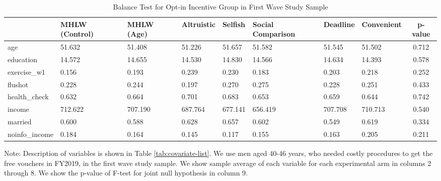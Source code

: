 \begin{table}[!h]

\caption{Balance Test for Opt-in Incentive Group in First Wave Study Sample \label{tab:int-coupon0-balance}}
\centering
\fontsize{9}{11}\selectfont
\begin{threeparttable}
\begin{tabular}[t]{l>{\centering\arraybackslash}p{3em}>{\centering\arraybackslash}p{3em}>{\centering\arraybackslash}p{3em}>{\centering\arraybackslash}p{3em}>{\centering\arraybackslash}p{3em}>{\centering\arraybackslash}p{3em}>{\centering\arraybackslash}p{3em}c}
\toprule
  & MHLW (Control) & MHLW (Age) & Altruistic & Selfish & Social Comparison & Deadline & Convenient & p-value\\
\midrule
age & \num{51.632} & \num{51.408} & \num{51.226} & \num{51.657} & \num{51.582} & \num{51.545} & \num{51.502} & \num{0.712}\\
education & \num{14.572} & \num{14.655} & \num{14.530} & \num{14.830} & \num{14.566} & \num{14.634} & \num{14.393} & \num{0.578}\\
exercise\_w1 & \num{0.156} & \num{0.193} & \num{0.239} & \num{0.230} & \num{0.183} & \num{0.203} & \num{0.218} & \num{0.252}\\
flushot & \num{0.228} & \num{0.244} & \num{0.197} & \num{0.270} & \num{0.275} & \num{0.228} & \num{0.251} & \num{0.433}\\
health\_check & \num{0.632} & \num{0.664} & \num{0.701} & \num{0.683} & \num{0.653} & \num{0.659} & \num{0.644} & \num{0.742}\\
income & \num{712.622} & \num{707.190} & \num{687.764} & \num{677.141} & \num{656.419} & \num{707.708} & \num{710.713} & \num{0.540}\\
married & \num{0.600} & \num{0.588} & \num{0.628} & \num{0.657} & \num{0.602} & \num{0.549} & \num{0.619} & \num{0.334}\\
noinfo\_income & \num{0.184} & \num{0.164} & \num{0.145} & \num{0.117} & \num{0.155} & \num{0.163} & \num{0.205} & \num{0.211}\\
\bottomrule
\end{tabular}
\begin{tablenotes}
\item Note: Description of variables is shown in Table \ref{tab:covariate-list}. We use men aged 40-46 years, who needed costly procedures to get the free vouchers in FY2019, in the first wave study sample. We show sample average of each variable for each experimental arm in columns 2 through 8. We show the p-value of F-test for joint null hypothesis in column 9.
\end{tablenotes}
\end{threeparttable}
\end{table}
